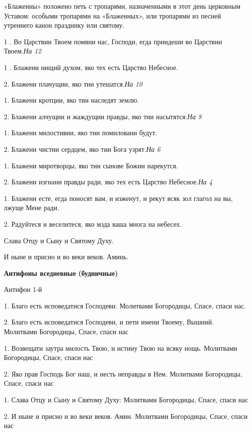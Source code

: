 «Блаженны» положено петь с тропарями, назначенными в этот день церковным Уставом: особыми тропарями на «Блаженных», или тропарями из песней утреннего канон празднику или святому.


1 . Во Царствии Твоем помяни нас, Господи, егда приидеши во Царствии Твоем.\itshape  На \normalfont{}12 


1 . Блажени нищий духом, яко тех есть Царство Небесное. 


2. Блажени плачущии, яко тии утешатся.\itshape  На \normalfont{}10 


1. Блажени кротции, яко тии наследят землю. 


2. Блажени алчущии и жаждущии правды, яко тии насытятся.\itshape  На\normalfont{} 8 


1. Блажени милостивии, яко тии помиловани будут. 


2. Блажени чистии сердцем, яко тии Бога узрят.\itshape  На\normalfont{} 6 


1. Блажени миротворцы, яко тии сынове Божии нарекутся. 


2. Блажени изгнани правды ради, яко тех есть Царство Небесное.\itshape  На\normalfont{} 4 


1. Блажени есте, егда поносят вам, и изженут, и рекут всяк зол глагол на вы, лжуще Мене ради. 


2. Радуйтеся и веселитеся, яко мзда ваша многа на небесех. 


Слава Отцу и Сыну и Святому Духу. 


И ныне и присно и во веки веков. Аминь. 


\medskip


\bfseries Антифоны вседневные (будничные) \normalfont{}\nopagebreak


Антифон 1-й 


1. Благо есть исповедатися Господеви. Молитвами Богородицы, Спасе, спаси нас. 


2. Благо есть исповедатися Господеви, и пети имени Твоему, Вышний. Молитвами Богородицы, Спасе, спаси нас 


1. Возвещати заутра милость Твою, и истину Твою на всяку нощь. Молитвами Богородицы, Спасе, спаси нас 


2. Яко прав Господь Бог наш, и несть неправды в Нем. Молитвами Богородицы, Спасе, спаси нас


1. Слава Отцу и Сыну и Святому Духу: Молитвами Богородицы, Спасе, спаси нас 


2. И ныне и присно и во веки веков. Амин. Молитвами Богородицы, Спасе, спаси нас


